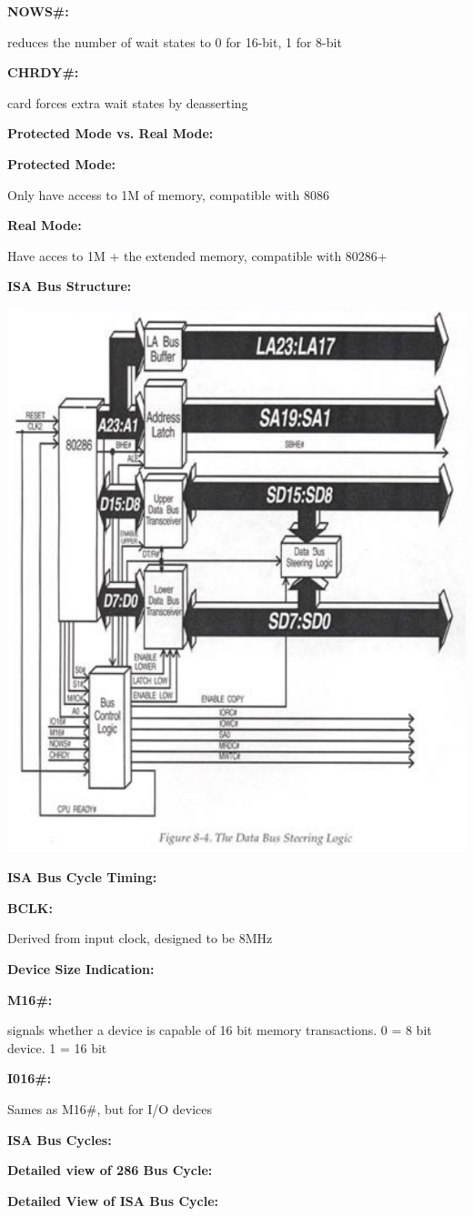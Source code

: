 \documentclass{article}
\newcommand{\ti}[1]{\hangindent=0.25in\noindent\begin{scriptsize}\textbf{#1:}\end{scriptsize}}
\newcommand{\hi}{\setlength\parindent{0.25in}\indent\hangindent=0.75in}
\begin{document}
\begin{scriptsize}
\begin{multicols*}{2}
			\hi\ti{NOWS\#} reduces the number of wait states to 0 for 16-bit, 1 for 8-bit
			
			\hi\ti{CHRDY\#} card forces extra wait states by deasserting 
		
		\ti{Protected Mode vs. Real Mode}
		
			\hi\ti{Protected Mode} Only have access to 1M of memory, compatible with 8086
			
			\hi\ti{Real Mode} Have acces to 1M + the extended memory, compatible with 80286+
		
		\ti{ISA Bus Structure} 
		
		\includegraphics[width=0.5\linewidth]{isaStruct}
		
		\ti{ISA Bus Cycle Timing}
		
			\hi\ti{BCLK} Derived from input clock, designed to be 8MHz
		
		\ti{Device Size Indication}
		
			\hi\ti{M16\#} signals whether a device is capable of 16 bit memory transactions. 0 = 8 bit device. 1 = 16 bit
			
			\hi\ti{I016\#} Sames as M16\#, but for I/O devices
		
		\ti{ISA Bus Cycles}
		
		\ti{Detailed view of 286 Bus Cycle}
		
		\ti{Detailed View of ISA Bus Cycle}
		
		
	\end{multicols*}
	\end{scriptsize}
\end{document}
